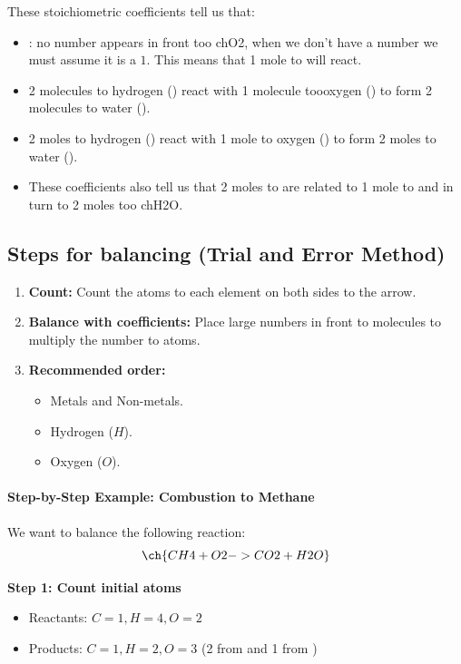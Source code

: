 These stoichiometric coefficients tell us that:
\begin{itemize}
    \item {}: no number appears in front too ch{O2}, when we don't have a number we must assume it is a \( 1 \). This means that 1 mole to  will react.
    \item 2 molecules to hydrogen () react with 1 molecule toooxygen () to form 2 molecules to water ().
    \item 2 moles to hydrogen () react with 1 mole to oxygen () to form 2 moles to water ().
    \item These coefficients also tell us that 2 moles to  are related to 1 mole to  and in turn to 2 moles too ch{H2O}.

\end{itemize}

\subsection{Steps for balancing (Trial and Error Method)}

\begin{enumerate}
    \item \textbf{Count:} Count the atoms to each element on both sides to the arrow.
    \item \textbf{Balance with coefficients:} Place large numbers in front to molecules to multiply the number to atoms.
    \item \textbf{Recommended order:}
    \begin{itemize}
        \item Metals and Non-metals.
        \item Hydrogen ($H$).
        \item Oxygen ($O$).
    \end{itemize}
\end{enumerate}

\paragraph{Step-by-Step Example: Combustion to Methane}

We want to balance the following reaction:
\[ \ch{CH4 + O2 -> CO2 + H2O} \]

        {\noindent  \textbf{Step 1: Count initial atoms}}

\begin{itemize}
    \item Reactants: $C=1, H=4, O=2$
    \item Products: $C=1, H=2, O=3$ (2 from  and 1 from )
\end{itemize}


